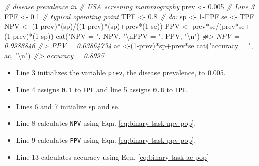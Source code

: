 \documentclass[
]{book}
\newenvironment{Shaded}{\begin{snugshade}}{\end{snugshade}}
\newcommand{\CommentTok}[1]{\textcolor[rgb]{0.56,0.35,0.01}{\textit{#1}}}
\newcommand{\DecValTok}[1]{\textcolor[rgb]{0.00,0.00,0.81}{#1}}
\newcommand{\FloatTok}[1]{\textcolor[rgb]{0.00,0.00,0.81}{#1}}
\newcommand{\FunctionTok}[1]{\textcolor[rgb]{0.00,0.00,0.00}{#1}}
\newcommand{\NormalTok}[1]{#1}
\newcommand{\OtherTok}[1]{\textcolor[rgb]{0.56,0.35,0.01}{#1}}
\newcommand{\SpecialCharTok}[1]{\textcolor[rgb]{0.00,0.00,0.00}{#1}}
\newcommand{\StringTok}[1]{\textcolor[rgb]{0.31,0.60,0.02}{#1}}
\providecommand{\tightlist}{%
  \setlength{\itemsep}{0pt}\setlength{\parskip}{0pt}}
\begin{document}
\begin{Shaded}
\begin{Highlighting}[numbers=left,,]
\CommentTok{\# disease prevalence in }
\CommentTok{\# USA screening mammography }
\NormalTok{prev }\OtherTok{\textless{}{-}} \FloatTok{0.005} \CommentTok{\# Line 3 }
\NormalTok{FPF }\OtherTok{\textless{}{-}} \FloatTok{0.1} \CommentTok{\# typical operating point }
\NormalTok{TPF }\OtherTok{\textless{}{-}} \FloatTok{0.8} \CommentTok{\#        do: }
\NormalTok{sp }\OtherTok{\textless{}{-}} \DecValTok{1}\SpecialCharTok{{-}}\NormalTok{FPF }
\NormalTok{se }\OtherTok{\textless{}{-}}\NormalTok{ TPF }
\NormalTok{NPV }\OtherTok{\textless{}{-}}\NormalTok{ (}\DecValTok{1}\SpecialCharTok{{-}}\NormalTok{prev)}\SpecialCharTok{*}\NormalTok{(sp)}\SpecialCharTok{/}\NormalTok{((}\DecValTok{1}\SpecialCharTok{{-}}\NormalTok{prev)}\SpecialCharTok{*}\NormalTok{(sp)}\SpecialCharTok{+}\NormalTok{prev}\SpecialCharTok{*}\NormalTok{(}\DecValTok{1}\SpecialCharTok{{-}}\NormalTok{se)) }
\NormalTok{PPV }\OtherTok{\textless{}{-}}\NormalTok{ prev}\SpecialCharTok{*}\NormalTok{se}\SpecialCharTok{/}\NormalTok{(prev}\SpecialCharTok{*}\NormalTok{se}\SpecialCharTok{+}\NormalTok{(}\DecValTok{1}\SpecialCharTok{{-}}\NormalTok{prev)}\SpecialCharTok{*}\NormalTok{(}\DecValTok{1}\SpecialCharTok{{-}}\NormalTok{sp)) }
\FunctionTok{cat}\NormalTok{(}\StringTok{"NPV = "}\NormalTok{, NPV, }\StringTok{"}\SpecialCharTok{\textbackslash{}n}\StringTok{PPV = "}\NormalTok{, PPV, }\StringTok{"}\SpecialCharTok{\textbackslash{}n}\StringTok{"}\NormalTok{)}
\CommentTok{\#\textgreater{} NPV =  0.9988846 }
\CommentTok{\#\textgreater{} PPV =  0.03864734}
\NormalTok{ac }\OtherTok{\textless{}{-}}\NormalTok{(}\DecValTok{1}\SpecialCharTok{{-}}\NormalTok{prev)}\SpecialCharTok{*}\NormalTok{sp}\SpecialCharTok{+}\NormalTok{prev}\SpecialCharTok{*}\NormalTok{se }
\FunctionTok{cat}\NormalTok{(}\StringTok{"accuracy = "}\NormalTok{, ac, }\StringTok{"}\SpecialCharTok{\textbackslash{}n}\StringTok{"}\NormalTok{)}
\CommentTok{\#\textgreater{} accuracy =  0.8995}
\end{Highlighting}
\end{Shaded}

\begin{itemize}
\tightlist
\item
  Line 3 initializes the variable \texttt{prev}, the disease prevalence, to 0.005.
\item
  Line 4 assigns \texttt{0.1} to \texttt{FPF} and line 5 assigns \texttt{0.8} to \texttt{TPF}.
\item
  Lines 6 and 7 initialize sp and se.
\item
  Line 8 calculates \texttt{NPV} using Eqn. \eqref{eq:binary-task-npv-pop}.
\item
  Line 9 calculates \texttt{PPV} using Eqn. \eqref{eq:binary-task-ppv-pop}.
\item
  Line 13 calculates accuracy using Eqn. \eqref{eq:binary-task-ac-pop}
\end{itemize}
\end{document}
